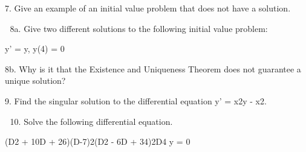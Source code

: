 \documentclass{ximera}
\begin{document}
7. Give an example of an initial value problem that does not have a solution.



8a. Give two different solutions to the following initial value problem:

	y’ = y, 	y(4) = 0
















8b. Why is it that the Existence and Uniqueness Theorem does not guarantee a unique solution?














9. Find the singular solution to the differential equation y’ = x2y - x2.


10. Solve the following differential equation.

	(D2 + 10D + 26)(D-7)2(D2 - 6D + 34)2D4 y = 0
\end{document}
